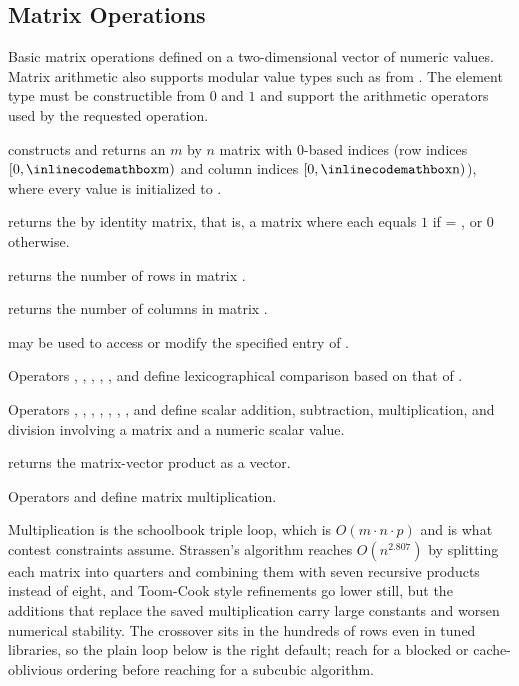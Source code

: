 \subsection{Matrix Operations}
\label{sec:6.5.1}
Basic matrix operations defined on a two-dimensional vector of numeric values. Matrix arithmetic also supports modular value types such as  from . The element type must be constructible from $0$ and $1$ and support the arithmetic operators used by the requested operation.

\begin{compactitem}
  \item {} constructs and returns an $m$ by $n$ matrix with 0-based indices (row indices $[0, {\inlinecodemath{m}})$ and column indices $[0, {\inlinecodemath{n}})$), where every value is initialized to .
  \item {} returns the  by  identity matrix, that is, a matrix where each  equals $1$ if  = , or $0$ otherwise.
  \item {} returns the number of rows in matrix .
  \item {} returns the number of columns in matrix .
  \item {} may be used to access or modify the specified entry of .
  \item Operators \inlinecode{\textless{}}, \inlinecode{\textgreater{}}, \inlinecode{\textless{}=}, \inlinecode{\textgreater{}=}, \inlinecode{==}, and \inlinecode{!=} define lexicographical comparison based on that of .
  \item Operators \inlinecode{+}, \inlinecode{-}, \inlinecode{*}, \inlinecode{/}, \inlinecode{+=}, \inlinecode{-=}, \inlinecode{*=}, and \inlinecode{/=} define scalar addition, subtraction, multiplication, and division involving a matrix and a numeric scalar value.
  \item {} returns the matrix-vector product as a vector.
  \item Operators \inlinecode{*} and \inlinecode{*=} define matrix multiplication.
\end{compactitem}

Multiplication is the schoolbook triple loop, which is $O(m \cdot n \cdot p)$ and is what contest constraints assume. Strassen's algorithm reaches $O(n^{2.807})$ by splitting each matrix into quarters and combining them with seven recursive products instead of eight, and Toom-Cook style refinements go lower still, but the additions that replace the saved multiplication carry large constants and worsen numerical stability. The crossover sits in the hundreds of rows even in tuned libraries, so the plain loop below is the right default; reach for a blocked or cache-oblivious ordering before reaching for a subcubic algorithm.

